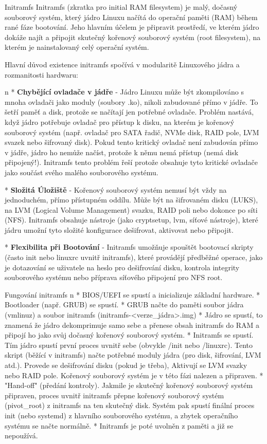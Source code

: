 \chap Initramfs
Initramfs (zkratka pro initial RAM filesystem) je malý, dočasný souborový systém, který jádro Linuxu načítá do operační paměti (RAM) během rané fáze bootování. Jeho hlavním účelem je připravit prostředí, ve kterém jádro dokáže najít a připojit skutečný kořenový souborový systém (root filesystem), na kterém je nainstalovaný celý operační systém.

Hlavní důvod existence initramfs spočívá v modularitě Linuxového jádra a rozmanitosti hardwaru:

\begitems \style n
* {\bf Chybějící ovladače v jádře} - Jádro Linuxu může být zkompilováno s mnoha ovladači jako moduly (soubory .ko), nikoli zabudované přímo v jádře. To šetří paměť a disk, protože se načítají jen potřebné ovladače. Problém nastává, když jádro potřebuje ovladač pro přístup k disku, na kterém je kořenový souborový systém (např. ovladač pro SATA řadič, NVMe disk, RAID pole, LVM svazek nebo šifrovaný disk). Pokud tento kritický ovladač není zabudován přímo v jádře, jádro ho nemůže načíst, protože k němu nemá přístup (nemá disk připojený!). Initramfs tento problém řeší protože obsahuje tyto kritické ovladače jako součást svého malého souborového systému.

* {\bf Složitá Úložiště} - Kořenový souborový systém nemusí být vždy na jednoduchém, přímo přístupném oddílu. Může být na šifrovaném disku (LUKS), na LVM (Logical Volume Management) svazku, RAID poli nebo dokonce po síti (NFS). Initramfs obsahuje nástroje (jako cryptsetup, lvm, síťové nástroje), které jádru umožní tyto složité konfigurace dešifrovat, aktivovat nebo připojit.

* {\bf Flexibilita při Bootování} - Initramfs umožňuje spouštět bootovací skripty (často init nebo linuxrc uvnitř initramfs), které provádějí předběžné operace, jako je dotazování se uživatele na heslo pro dešifrování disku, kontrola integrity souborového systému nebo příprava síťového připojení pro NFS root.
\enditems

\sec Fungování initramfs
\begitems \style n
* BIOS/UEFI se spustí a inicializuje základní hardware.
* Bootloader (např. GRUB) se spustí.
* GRUB načte do paměti soubor jádra (vmlinuz) a soubor initramfs (initramfs-<verze\_jádra>.img)
* Jádro se spustí, to znamená že jádro dekomprimuje samo sebe a přenese obsah initramfs do RAM a připojí ho jako svůj dočasný kořenový souborový systém.
* Initramfs se spustí. Tím jádro spustí první proces uvnitř sebe (obvykle /init nebo /linuxrc). Tento skript (běžící v initramfs) načte potřebné moduly jádra (pro disk, šifrování, LVM atd.). Provede se dešifrování disku (pokud je třeba), Aktivují se LVM svazky nebo RAID pole. Kořenový souborový systém je v této fázi nalezen a připraven.
* "Hand-off" (předání kontroly). Jakmile je skutečný kořenový souborový systém připraven, proces uvnitř initramfs přepne kořenový souborový systém (pivot\_root) z initramfs na ten skutečný disk. Systém pak spustí finální proces init (nebo systemd) z hlavního souborového systému, a zbytek operačního systému se načte normálně.
* Initramfs je poté uvolněn z paměti a již se nepoužívá.
\enditems


